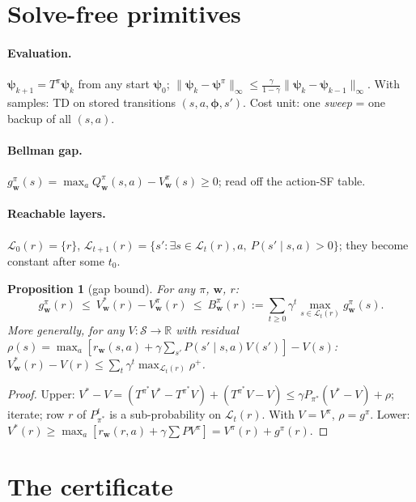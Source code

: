 \documentclass[11pt]{article}
\newcommand{\vphi}{\bm{\phi}}
\newcommand{\vpsi}{\bm{\psi}}
\newcommand{\w}{\mathbf{w}}
\newcommand{\cS}{\mathcal S}
\newcommand{\cL}{\mathcal L}
\newcommand{\R}{\mathbb R}
\newtheorem{proposition}{Proposition}
\theoremstyle{definition}
\begin{document}
\section{Solve-free primitives}

\paragraph{Evaluation.} $\vpsi_{k+1}=T^\pi\vpsi_k$ from any start $\vpsi_0$; $\|\vpsi_k-\vpsi^\pi\|_\infty\le
\frac{\gamma}{1-\gamma}\|\vpsi_k-\vpsi_{k-1}\|_\infty$. With samples: TD on stored transitions $(s,a,\vphi,s')$.
Cost unit: one \emph{sweep} = one backup of all $(s,a)$.

\paragraph{Bellman gap.} $g^\pi_\w(s)=\max_aQ^\pi_\w(s,a)-V^\pi_\w(s)\ge0$; read off the action-SF table.

\paragraph{Reachable layers.} $\cL_0(r)=\{r\}$, $\cL_{t+1}(r)=\{s':\exists s\in\cL_t(r),a,\ P(s'\mid s,a)>0\}$; they
become constant after some $t_0$.

\begin{proposition}[gap bound]\label{prop:gap}
For any $\pi$, $\w$, $r$:
\[
g^\pi_\w(r)\ \le\ V^*_\w(r)-V^\pi_\w(r)\ \le\ B^\pi_\w(r):=\textstyle\sum_{t\ge0}\gamma^t\max_{s\in\cL_t(r)}g^\pi_\w(s).
\]
More generally, for any $V:\cS\to\R$ with residual
$\rho(s)=\max_a[r_\w(s,a)+\gamma\sum_{s'}P(s'\mid s,a)V(s')]-V(s)$:\quad
$V^*_\w(r)-V(r)\le\sum_t\gamma^t\max_{\cL_t(r)}\rho^+$.
\end{proposition}
\begin{proof}
Upper: $V^*-V=(T^{\pi^*}V^*-T^{\pi^*}V)+(T^{\pi^*}V-V)\le\gamma P_{\pi^*}(V^*-V)+\rho$; iterate; row $r$ of
$P^t_{\pi^*}$ is a sub-probability on $\cL_t(r)$. With $V=V^\pi$, $\rho=g^\pi$. Lower: $V^*(r)\ge
\max_a[r_\w(r,a)+\gamma\sum P V^\pi]=V^\pi(r)+g^\pi(r)$.
\end{proof}

\section{The certificate}
\end{document}
